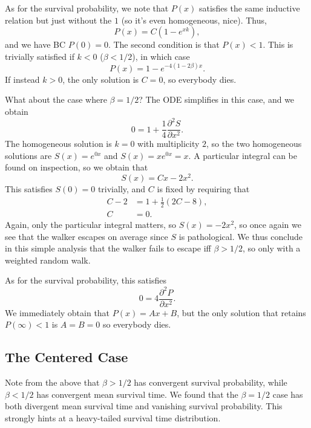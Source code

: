 \documentclass[12pt]{report}
\newcommand*{\ptd}[2]{\frac{\partial^2 #1}{\partial#2^2}}
\newcommand*{\p}[1]{\left(#1\right)}
\begin{document}
As for the survival probability, we note that $P(x)$ satisfies the same
inductive relation but just without the $1$ (so it's even homogeneous, nice).
Thus,
\begin{equation}
    P(x) = C\p{1 - e^{xk}},
\end{equation}
and we have BC $P(0) = 0$. The second condition is that $P(x) < 1$. This is
trivially satisfied if $k < 0$ ($\beta < 1/2$), in which case
\begin{equation}
    P(x) = 1 - e^{-4\p{1 - 2\beta} x}.
\end{equation}
If instead $k > 0$, the only solution is $C = 0$, so everybody dies.

What about the case where $\beta = 1/2$? The ODE simplifies in this case, and we
obtain
\begin{equation}
    0 = 1 + \frac{1}{4}\ptd{S}{x}.
\end{equation}
The homogeneous solution is $k = 0$ with multiplicity $2$, so the two
homogeneous solutions are $S(x) = e^{0x}$ and $S(x) = xe^{0x} = x$. A particular
integral can be found on inspection, so we obtain that
\begin{equation}
    S(x) = Cx - 2x^2.
\end{equation}
This satisfies $S(0) = 0$ trivially, and $C$ is fixed by requiring that
\begin{align}
    C - 2 &= 1 + \frac{1}{2}\p{2C - 8},\\
    C &= 0.
\end{align}
Again, only the particular integral matters, so $S(x) = -2x^2$, so once again we
see that the walker escapes on average since $S$ is pathological. We thus
conclude in this simple analysis that the walker fails to escape iff $\beta >
1/2$, so only with a weighted random walk.

As for the survival probability, this satisfies
\begin{equation}
    0 = 4\ptd{P}{x}.
\end{equation}
We immediately obtain that $P(x) = Ax + B$, but the only solution that retains
$P(\infty) < 1$ is $A = B = 0$ so everybody dies.

\subsection{The Centered Case}

Note from the above that $\beta > 1/2$ has convergent survival probability,
while $\beta < 1/2$ has convergent mean survival time. We found that the $\beta
= 1/2$ case has both divergent mean survival time and vanishing survival
probability. This strongly hints at a heavy-tailed survival time distribution.
\end{document}
